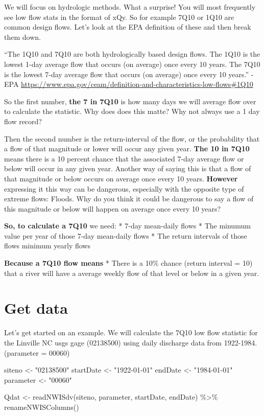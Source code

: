 \documentclass[
]{book}
\newenvironment{Shaded}{\begin{snugshade}}{\end{snugshade}}
\newcommand{\FunctionTok}[1]{\textcolor[rgb]{0.00,0.00,0.00}{#1}}
\newcommand{\NormalTok}[1]{#1}
\newcommand{\OtherTok}[1]{\textcolor[rgb]{0.56,0.35,0.01}{#1}}
\newcommand{\SpecialCharTok}[1]{\textcolor[rgb]{0.00,0.00,0.00}{#1}}
\newcommand{\StringTok}[1]{\textcolor[rgb]{0.31,0.60,0.02}{#1}}
\begin{document}
We will focus on hydrologic methods. What a surprise! You will most frequently see low flow stats in the format of xQy. So for example 7Q10 or 1Q10 are common design flows. Let's look at the EPA definition of these and then break them down.

``The 1Q10 and 7Q10 are both hydrologically based design flows. The 1Q10 is the lowest 1-day average flow that occurs (on average) once every 10 years. The 7Q10 is the lowest 7-day average flow that occurs (on average) once every 10 years.'' -EPA \url{https://www.epa.gov/ceam/definition-and-characteristics-low-flows\#1Q10}

So the first number, \textbf{the 7 in 7Q10} is how many days we will average flow over to calculate the statistic. Why does does this matte? Why not always use a 1 day flow record?

Then the second number is the return-interval of the flow, or the probability that a flow of that magnitude or lower will occur any given year. \textbf{The 10 in 7Q10} means there is a 10 percent chance that the associated 7-day average flow or below will occur in any given year. Another way of saying this is that a flow of that magnitude or below occurs on average once every 10 years. \textbf{However} expressing it this way can be dangerous, especially with the opposite type of extreme flows: Floods. Why do you think it could be dangerous to say a flow of this magnitude or below will happen on average once every 10 years?

\textbf{So, to calculate a 7Q10} we need:
* 7-day mean-daily flows
* The minumum value per year of those 7-day mean-daily flows
* The return intervals of those flows minimum yearly flows

\textbf{Because a 7Q10 flow means}
* There is a 10\% chance (return interval = 10) that a river will have a average weekly flow of that level or below in a given year.

\hypertarget{get-data-1}{%
\section{Get data}\label{get-data-1}}

Let's get started on an example. We will calculate the 7Q10 low flow statistic for the Linville NC usgs gage (02138500) using daily discharge data from 1922-1984. (parameter = 00060)

\begin{Shaded}
\begin{Highlighting}[]
\NormalTok{siteno }\OtherTok{\textless{}{-}} \StringTok{"02138500"}
\NormalTok{startDate }\OtherTok{\textless{}{-}} \StringTok{"1922{-}01{-}01"}
\NormalTok{endDate }\OtherTok{\textless{}{-}} \StringTok{"1984{-}01{-}01"}
\NormalTok{parameter }\OtherTok{\textless{}{-}} \StringTok{"00060"}

\NormalTok{Qdat }\OtherTok{\textless{}{-}} \FunctionTok{readNWISdv}\NormalTok{(siteno, parameter, startDate, endDate) }\SpecialCharTok{\%\textgreater{}\%} 
  \FunctionTok{renameNWISColumns}\NormalTok{()}
\end{Highlighting}
\end{Shaded}
\end{document}
